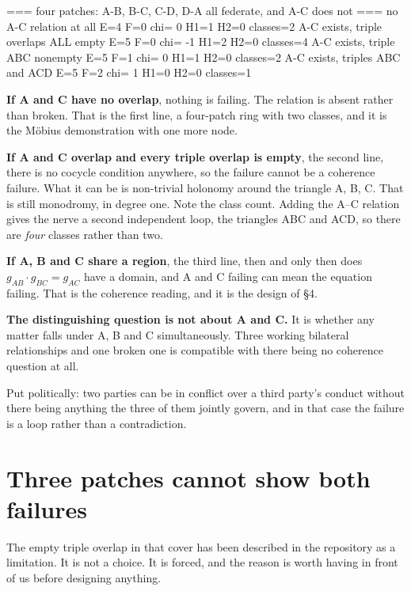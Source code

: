 \documentclass[11pt,a4paper]{article}
\begin{document}
\begin{term}
=== four patches: A-B, B-C, C-D, D-A all federate, and A-C does not ===
  no A-C relation at all                       E=4 F=0  chi=  0   H1=1  H2=0   classes=2
  A-C exists, triple overlaps ALL empty        E=5 F=0  chi= -1   H1=2  H2=0   classes=4
  A-C exists, triple ABC nonempty              E=5 F=1  chi=  0   H1=1  H2=0   classes=2
  A-C exists, triples ABC and ACD              E=5 F=2  chi=  1   H1=0  H2=0   classes=1
\end{term}

\textbf{If A and C have no overlap}, nothing is failing. The relation is absent
rather than broken. That is the first line, a four-patch ring with two classes,
and it is the M\"obius demonstration with one more node.

\textbf{If A and C overlap and every triple overlap is empty}, the second line,
there is no cocycle condition anywhere, so the failure cannot be a coherence
failure. What it can be is non-trivial holonomy around the triangle A, B, C.
That is still monodromy, in degree one. Note the class count. Adding the A--C
relation gives the nerve a second independent loop, the triangles ABC and ACD,
so there are \emph{four} classes rather than two.

\textbf{If A, B and C share a region}, the third line, then and only then does
$g_{AB} \cdot g_{BC} = g_{AC}$ have a domain, and A and C failing can mean the
equation failing. That is the coherence reading, and it is the design of \S4.

\begin{sectionbox}
\textbf{The distinguishing question is not about A and C.} It is whether any
matter falls under A, B and C simultaneously. Three working bilateral
relationships and one broken one is compatible with there being no coherence
question at all.

Put politically: two parties can be in conflict over a third party's conduct
without there being anything the three of them jointly govern, and in that case
the failure is a loop rather than a contradiction.
\end{sectionbox}

\section{Three patches cannot show both failures}

The empty triple overlap in that cover has been described in the repository as
a limitation. It is not a choice. It is forced, and the reason is worth having
in front of us before designing anything.
\end{document}
